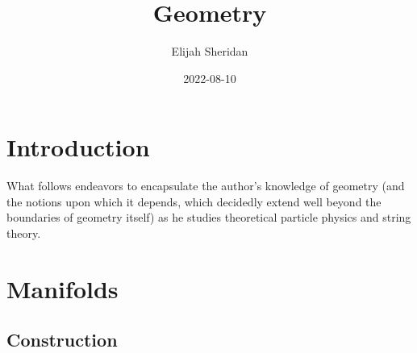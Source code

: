 \documentclass[
]{book}
\title{Geometry}
\author{Elijah Sheridan}
\date{2022-08-10}
\begin{document}
\maketitle

{
\setcounter{tocdepth}{1}
\tableofcontents
}
\hypertarget{intro}{%
\chapter{Introduction}\label{intro}}

What follows endeavors to encapsulate the author's knowledge of geometry (and the notions upon which it depends, which decidedly extend well beyond the boundaries of geometry itself) as he studies theoretical particle physics and string theory.

\hypertarget{manifolds}{%
\chapter{Manifolds}\label{manifolds}}

\hypertarget{construction}{%
\section{Construction}\label{construction}}
\end{document}
